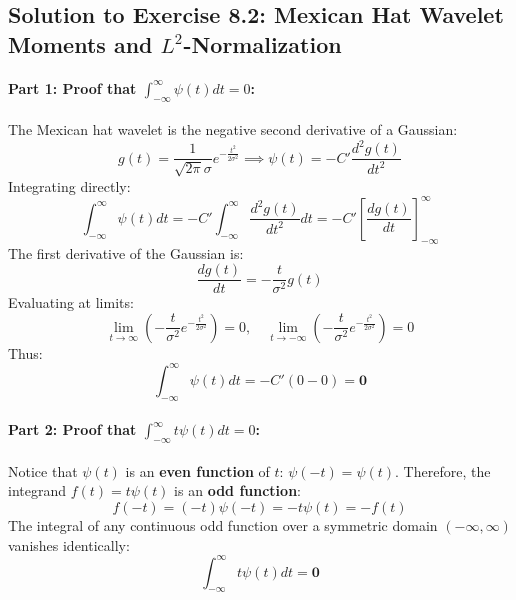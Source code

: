 \documentclass[11pt,twoside,openright]{book}
\begin{document}
\subsection*{Solution to Exercise 8.2: Mexican Hat Wavelet Moments and $L^2$-Normalization}

\paragraph{Part 1: Proof that $\int_{-\infty}^\infty \psi(t) dt = 0$:}
The Mexican hat wavelet is the negative second derivative of a Gaussian:
\begin{equation*}
g(t) = \frac{1}{\sqrt{2\pi}\sigma} e^{-\frac{t^2}{2\sigma^2}} \implies \psi(t) = -C' \frac{d^2 g(t)}{dt^2}
\end{equation*}
Integrating directly:
\begin{equation*}
\int_{-\infty}^\infty \psi(t) dt = -C' \int_{-\infty}^\infty \frac{d^2 g(t)}{dt^2} dt = -C' \left[ \frac{d g(t)}{dt} \right]_{-\infty}^\infty
\end{equation*}
The first derivative of the Gaussian is:
\begin{equation*}
\frac{d g(t)}{dt} = -\frac{t}{\sigma^2} g(t)
\end{equation*}
Evaluating at limits:
\begin{equation*}
\lim_{t \to \infty} \left( -\frac{t}{\sigma^2} e^{-\frac{t^2}{2\sigma^2}} \right) = 0, \quad \lim_{t \to -\infty} \left( -\frac{t}{\sigma^2} e^{-\frac{t^2}{2\sigma^2}} \right) = 0
\end{equation*}
Thus:
\begin{equation*}
\int_{-\infty}^\infty \psi(t) dt = -C' (0 - 0) = \mathbf{0}
\end{equation*}

\paragraph{Part 2: Proof that $\int_{-\infty}^\infty t \psi(t) dt = 0$:}
Notice that $\psi(t)$ is an \textbf{even function} of $t$: $\psi(-t) = \psi(t)$.
Therefore, the integrand $f(t) = t \psi(t)$ is an \textbf{odd function}:
\begin{equation*}
f(-t) = (-t) \psi(-t) = -t \psi(t) = -f(t)
\end{equation*}
The integral of any continuous odd function over a symmetric domain $(-\infty, \infty)$ vanishes identically:
\begin{equation*}
\int_{-\infty}^\infty t \psi(t) dt = \mathbf{0}
\end{equation*}
\end{document}
